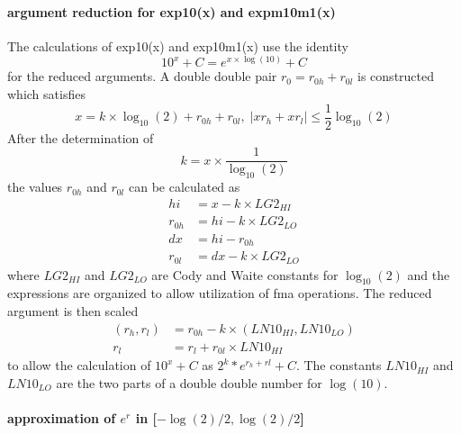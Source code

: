 \documentclass[10pt,a4paper,final,oneside]{article}
\numberwithin{equation}{subsection}
\begin{document}
\paragraph{argument reduction for exp10(x) and expm10m1(x)}

The calculations of exp10(x) and exp10m1(x) use the
identity
\begin{equation}
  10^x + C = e^{x \times \log{(10)}} + C
\end{equation}
for the reduced arguments. A  double double pair $ r_0= r_{0h} + r_{0l} $ is constructed which satisfies
\begin{equation}
  x = k \times \log_{10}{(2)} + r_{0h} + r_{0l}, \;
  |xr_h +xr_l| \le \frac{1}{2} \log_{10}{(2)}
\end{equation}
After the determination of
\[
k = x \times \frac{1}{\log_{10}{(2)}}
\]
the values $r_{0h}$ and $r_{0l}$ can be calculated as
\[
\begin{aligned}
  hi &= x - k \times LG2_{HI} \\
  r_{0h} &= hi - k \times LG2_{LO} \\
  dx & = hi - r_{0h} \\
  r_{0l} &= dx - k \times LG2_{LO}
\end{aligned}
\]
where $LG2_{HI}$ and $LG2_{LO}$ are Cody and Waite constants for
$\log_{10}{(2)}$
and the expressions are organized to allow utilization of fma operations.
The reduced argument is then scaled
\[
\begin{aligned}
  (r_h, r_l) &= r_{0h} - k \times (LN10_{HI}, LN10_{LO}) \\
  r_l &= r_l + r_{0l} \times LN10_{HI}
\end{aligned}
\]
to allow the calculation of $ 10^x + C $ as $ 2^k * e^{r_h+ rl} + C$.
The constants $LN10_{HI}$ and $LN10_{LO}$ are the two parts of a
double double number for $\log(10)$.


\paragraph{approximation of $e^r$ in [$-\log(2)/2, \log(2)/2$]}
\end{document}

